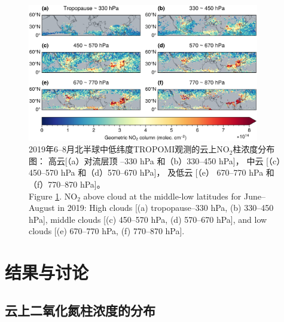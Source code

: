 


\begin{figure}[H]
    \centering
    \includegraphics[width=0.9\textwidth]{./figures/no2geo_tropomi.png}
    \caption{
    2019年6--8月北半球中低纬度TROPOMI观测的云上NO$_2$柱浓度分布图：
    高云[（a）对流层顶 --330 hPa 和（b）330--450 hPa]，
    中云 [（c）450--570 hPa 和（d）570--670 hPa]，
    及低云 [（e） 670--770 hPa 和（f）770--870 hPa]。 \\
    Figure \ref{fig:no2geo_tropomi}. NO$_2$ above cloud at the middle-low latitudes for June--August in 2019:
    High clouds [(a) tropopause--330 hPa, (b) 330--450 hPa],
    middle clouds [(c) 450--570 hPa, (d) 570--670 hPa],
    and low clouds [(e) 670--770 hPa, (f) 770--870 hPa].
    }
    \label{fig:no2geo_tropomi}
\end{figure}

\section{结果与讨论}

\subsection{云上二氧化氮柱浓度的分布} \label{sec:no2_vcd_cld}

